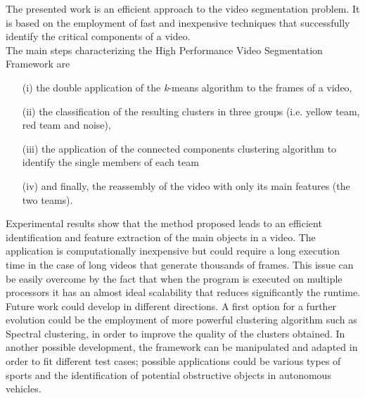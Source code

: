 \documentclass{usiinftr}
\begin{document}
The presented work is an efficient approach to the video segmentation problem. It is based on the employment of fast and inexpensive techniques that successfully identify the critical components of a video. \\
The main steps characterizing the High Performance Video Segmentation Framework are 
\begin{itemize}
	\item[(i)] the double application of the \textit{k}-means algorithm to the frames of a video, 
	\item[(ii)] the classification of the resulting clusters in three groups (i.e. yellow team, red team and noise), 
	\item[(iii)] the application of the connected components clustering algorithm to identify the single members of each team
	\item[(iv)] and finally, the reassembly of the video with only its main features (the two teams). \\
\end{itemize}
Experimental results show that the method proposed leads to an efficient identification and feature extraction of the main objects in a video. The application is computationally inexpensive but could require a long execution time in the case of long videos that generate thousands of frames. This issue can be easily overcome by the fact that when the program is executed on multiple processors it has an almost ideal scalability that reduces significantly the runtime. \\
Future work could develop in different directions. A first option for a further evolution could be the employment of more powerful clustering algorithm such as Spectral clustering, in order to improve the quality of the clusters obtained. In another possible development, the framework can be manipulated and adapted in order to fit different test cases; possible applications could be various types of sports and the identification of potential obstructive objects in autonomous vehicles.

  
\end{document}
